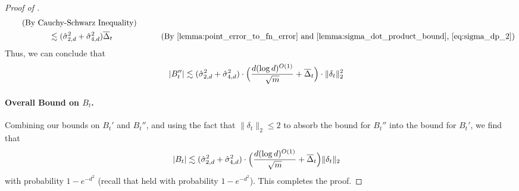 \begin{proof}[Proof of ]
\begin{align}
& \tag{By Cauchy-Schwarz Inequality} \\
& \nextlinespace\nextlinespace \lesssim (\sigmaCoeffTwo^2 + \sigmaCoeffFour^2) \deltaBar_t
& \tag{By \Cref{lemma:point_error_to_fn_error} and \Cref{lemma:sigma_dot_product_bound}, \Cref{eq:sigma_dp_2}}
\end{align}
Thus, we can conclude that
\begin{align} \label{eq:bt_double_prime_bound}
|B_t''|
& \lesssim (\hat{\sigma}_{2, d}^2 + \hat{\sigma}_{4, d}^2) \cdot \Big(\frac{d (\log d)^{O(1)}}{\sqrt{m}} + \overline{\Delta}_t \Big) \cdot \|\delta_t\|_2^2
\end{align}

\paragraph{Overall Bound on $B_t$.} Combining our bounds on $B_t'$ and $B_t''$, and using the fact that $\|\delta_t\|_2 \leq 2$ to absorb the bound for $B_t''$ into the bound for $B_t'$, we find that
\begin{align}
|B_t|
& \lesssim (\hat{\sigma}_{2, d}^2 + \hat{\sigma}_{4, d}^2) \cdot \Big(\frac{d (\log d)^{O(1)}}{\sqrt{m}} + \overline{\Delta}_t \Big) \|\delta_t\|_2
\end{align}
with probability $1 - e^{-d^2}$ (recall that  held with probability $1 - e^{-d^2}$). This completes the proof.
\end{proof}

